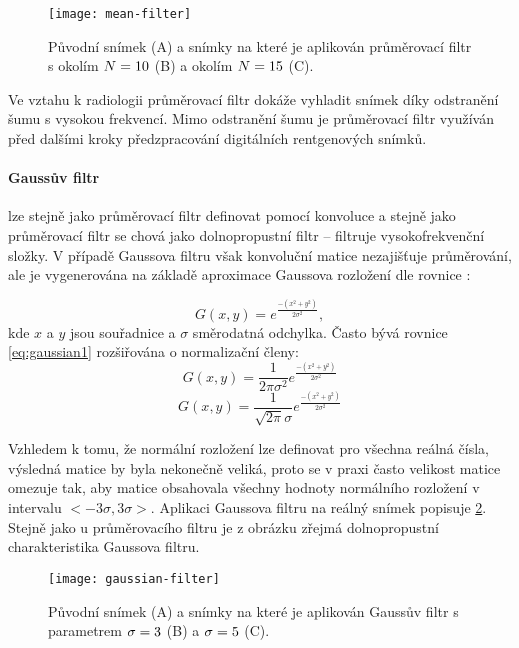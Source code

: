 \begin{figure}[h]
\centering
\texttt{[image: mean-filter]}
\caption{Původní snímek (A) a snímky na které je aplikován průměrovací filtr s okolím $\protect N=10$ (B) a okolím $\protect N=15$ (C).}
\label{fig:mean-filter}
\end{figure}

Ve vztahu k radiologii průměrovací filtr dokáže vyhladit snímek díky odstranění šumu s vysokou frekvencí. Mimo odstranění šumu je průměrovací filtr využíván před dalšími kroky předzpracování digitálních rentgenových snímků. \cite{Diagnostic-Radiology-Physics}

\paragraph{Gaussův filtr}
lze stejně jako průměrovací filtr definovat pomocí konvoluce a stejně jako průměrovací filtr se chová jako dolnopropustní filtr -- filtruje vysokofrekvenční složky. V případě Gaussova filtru však konvoluční matice nezajišťuje průměrování, ale je vygenerována na základě aproximace Gaussova rozložení dle rovnice \cite[str.~139]{Image-Processing-Analysis-and-Machine-Vision}:

\begin{equation}
\label{eq:gaussian1}
G(x,y)=e^{\frac{-(x^2+y^2)}{2\sigma^2}},
\end{equation}
kde $x$ a $y$ jsou souřadnice a $\sigma$ směrodatná odchylka. Často bývá rovnice \ref{eq:gaussian1} rozšiřována o normalizační členy:
\begin{equation}
\label{eq:gaussian2}
G(x,y)= \frac{1}{2\pi\sigma^2} e^{\frac{-(x^2+y^2)}{2\sigma^2}} 
\end{equation}
\begin{equation}
\label{eq:gaussian3}
G(x,y)= \frac{1}{\sqrt{2\pi}\sigma} e^{\frac{-(x^2+y^2)}{2\sigma^2}}
\end{equation}

Vzhledem k tomu, že normální rozložení lze definovat pro všechna reálná čísla, výsledná matice by byla nekonečně veliká, proto se v praxi často velikost matice omezuje tak, aby matice obsahovala všechny hodnoty normálního rozložení v intervalu $<-3\sigma, 3\sigma>$. Aplikaci Gaussova filtru na reálný snímek popisuje \cref{fig:gaussian-filter}. Stejně jako u průměrovacího filtru je z obrázku zřejmá dolnopropustní charakteristika Gaussova filtru.

\begin{figure}[h]
\centering
\texttt{[image: gaussian-filter]}
\caption{Původní snímek (A) a snímky na které je aplikován Gaussův filtr s parametrem $\protect\sigma=3$ (B) a $\protect\sigma=5$ (C).}
\label{fig:gaussian-filter}
\end{figure}

